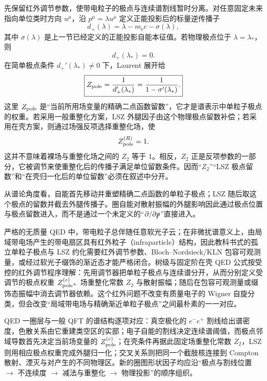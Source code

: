 先保留红外调节参数，使带电粒子的极点与连续谱割线暂时分离。对任意固定未来指向单位类时方向 $u^\mu$，沿 $p^\mu=\lambda u^\mu$ 定义正能投影后的标量逆传播子
\begin{equation*}
 d_+(\lambda)
 =\lambda-m_{\mathrm e} c-\sigma(\lambda),
\end{equation*}
其中 $\sigma(\lambda)$ 是上一节已经定义的正能投影自能本征值。若物理极点位于 $\lambda=\lambda_*$，则
\begin{equation*}
 d_+(\lambda_*)=0.
\end{equation*}
在简单极点条件 $d_+'(\lambda_*)\neq0$ 下，Laurent 展开给
\begin{equation}
 \boxed{
 Z_{\rm pole}
 =\frac{1}{d_+'(\lambda_*)}
 =\frac{1}{1-\sigma'(\lambda_*)}.}
 \label{eq:qed-pole-residue-selfenergy-dp9}
\end{equation}
这里 $Z_{\rm pole}$ 是“当前所用场变量的精确二点函数留数”，它才是谱表示中单粒子极点的权重。若采用一般重整化方案，LSZ 外腿因子由这个物理极点留数补偿；若采用在壳方案，则通过场强反项选择重整化场，使
\begin{equation*}
 Z_{\rm pole}^{(R)}=1.
\end{equation*}
这并不意味着裸场与重整化场之间的 $Z_2$ 等于 1。相反，$Z_2$ 正是反项参数的一部分，它被调节来使重整化后的传播子满足单位留数条件。因而“$Z_2$”“LSZ 极点留数”和“在壳归一化后的单位留数”必须在叙述中分开。

从谱论角度看，自能首先移动并重塑精确二点函数的单粒子极点；LSZ 随后取这个极点的留数并截去外腿传播子。圈自能对散射振幅的外腿影响因此通过极点位置与极点留数进入，而不是通过一个未定义的“$\partial/\partial\slashed p$”直接进入。

\begin{note}
严格的无质量 QED 中，带电粒子总伴随任意软光子云；在非微扰谱意义上，由局域带电场产生的带电扇区具有红外粒子（infraparticle）结构，因此教科书式的孤立单粒子极点与 LSZ 约化需要红外调节参数、Bloch--Nordsieck/KLN 包容可观测量，或经过软光子缀饰的渐近态才能严格闭合。树级与固定阶在壳 QED 公式按受控的红外调节程序理解：先用调节器把单粒子极点与连续谱分开，从而分别定义受调节的极点权重 $Z_{\rm pole}^{(e)}$、场重整化常数 $Z_2$ 与散射振幅；随后在包容可观测量或缀饰态振幅中消去调节器依赖。这个红外问题不改变有质量电子的 Wigner 自旋分类，但会改变“局域带电场与精确渐近单粒子极点”之间最朴素的一一对应。
\end{note}

QED 一圈层与一般 QFT 的谱结构逐项对应：真空极化的 $e^-e^+$ 割线给出谱密度，色散关系由它重建类空区的实部；电子自能的割线决定连续谱阈值，而极点邻域导数首先决定当前场变量的 $Z_{\rm pole}^{(e)}$；在壳条件再据此固定场重整化常数 $Z_2$，LSZ 则用相应极点权重完成外腿归一化；交叉关系则把同一个截肢核连接到 Compton 散射、湮灭与对产生的不同物理区。新的圈图形状因子均应沿“极点与割线位置 $\to$ 不连续度 $\to$ 减法与重整化 $\to$ 物理投影”的顺序组织。

